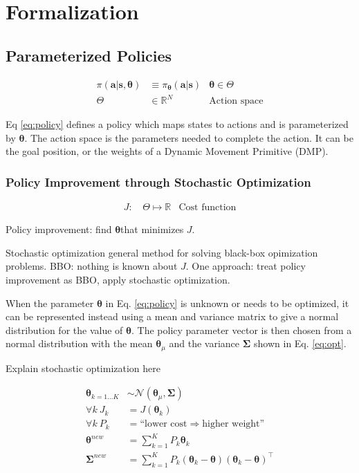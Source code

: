 \documentclass[12pt]{article}
\newcommand{\act}    {\ensuremath{\mathbf{a}}}
\newcommand{\sta}    {\ensuremath{\mathbf{s}}}
\newcommand{\appsp}  {\ensuremath{\Theta}}
\newcommand{\costf}  {\ensuremath{J}}
\newcommand{\app}    {\ensuremath{\bm{\theta}}}
\newcommand{\covar}  {\ensuremath{\bm{\Sigma}}}
\begin{document}
\section{Formalization}

\subsection{Parameterized Policies}

\begin{align}
\label{eq:policy}\pi(\act|\sta,\app) &\equiv  \pi_{\app}(\act|\sta) & \app \in \appsp \\
\appsp &\in \mathbb{R}^N & \mbox{Action space}
\end{align}

Eq \ref{eq:policy} defines a policy which maps states to actions and is parameterized by $\app$. The action space is the parameters needed to complete the action. It can be the goal position, or the weights of a Dynamic Movement Primitive (DMP).

\subsubsection{Policy Improvement through Stochastic Optimization}

\begin{align}
\costf\mbox{: } &\label{eq:cost} \appsp \mapsto \mathbb{R}&\mbox{Cost function}
\end{align}

Policy improvement: find \app that minimizes \costf.

Stochastic optimization general method for solving black-box opimization problems. BBO: nothing is known about \costf. One approach: treat policy improvement as BBO, apply stochastic optimization.

When the parameter $\app$ in Eq. \ref{eq:policy} is unknown or needs to be optimized, it can be represented instead using a mean and variance matrix to give a normal distribution for the value of $\app$. The policy parameter vector is then chosen from a normal distribution with the mean $\app_\mu$ and the variance $\covar$ shown in Eq. \ref{eq:opt}.

\color{red}Explain stochastic optimization here \color{black}


\begin{align*}
\app_{k=1\dots K} & {\sim}\mathcal{N}({\app_\mu},{\covar})\\
\forall k~J_k & = J(\app_k)\\
\forall k~P_k & = \mbox{``lower cost} \Rightarrow \mbox{higher weight''}\\
\app^{new} & = \sum_{k=1}^{K} P_k \app_k\\
\covar^{new} & = \sum_{k=1}^{K}P_k(\app_k-\app)(\app_k-\app)^\intercal
\end{align*}
\end{document}
